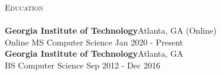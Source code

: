 \documentclass[a4paper]{article}
\newcommand{\lineunder} {
    \vspace*{-8pt} \\
    \hspace*{-18pt} \hrulefill \\
}
\newcommand{\header} [1] {
    {\hspace*{-18pt}\vspace*{6pt} \textsc{#1}}
    \vspace*{-6pt} \lineunder
}
\begin{document}
\header{Education}
\textbf{Georgia Institute of Technology}\hfill Atlanta, GA (Online)\\
Online MS Computer Science \hfill Jan 2020 - Present\\
\vspace{2mm}
\textbf{Georgia Institute of Technology}\hfill Atlanta, GA\\
BS Computer Science \hfill Sep 2012 - Dec 2016\\
\vspace{2mm}



\ 
\end{document}
